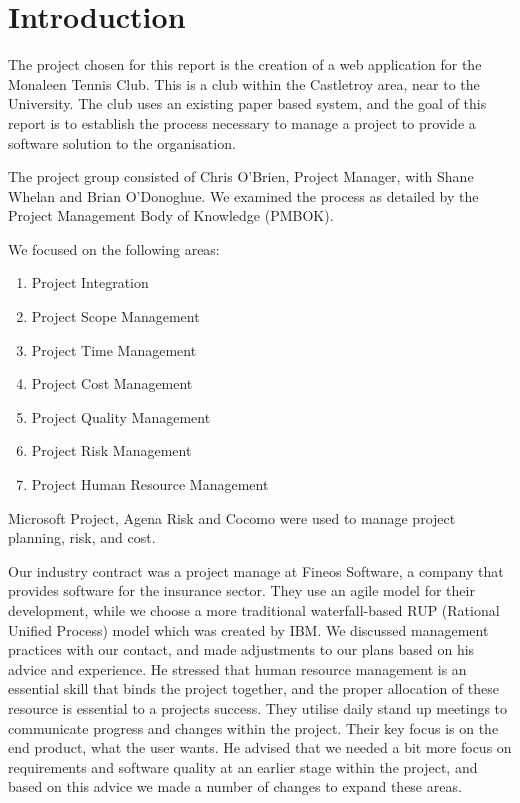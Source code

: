 \chapter{Introduction}

The project chosen for this report is the creation of a web application for the Monaleen Tennis Club. This is a club within the Castletroy area, near to the University. The club uses an existing paper based system, and the goal of this report is to establish the process necessary to manage a project to provide a software solution to the organisation. 

The project group consisted of Chris O'Brien, Project Manager, with Shane Whelan and Brian O'Donoghue. We examined the process as detailed by the Project Management Body of Knowledge (PMBOK).

We focused on the following areas:

\begin{enumerate}
\item Project Integration
\item Project Scope Management
\item Project Time Management
\item Project Cost Management
\item Project Quality Management
\item Project Risk Management
\item Project Human Resource Management
\end{enumerate}

Microsoft Project, Agena Risk and Cocomo were used to manage project planning, risk, and cost. 

Our industry contract was a project manage at Fineos Software, a company that provides software for the insurance sector. They use an agile model for their development, while we choose a more traditional waterfall-based RUP (Rational Unified Process) model which was created by IBM. We discussed management practices with our contact, and made adjustments to our plans based on his advice and experience. He stressed that human resource management is an essential skill that binds the project together, and the proper allocation of these resource is essential to a projects success. They utilise daily stand up meetings to communicate progress and changes within the project. Their key focus is on the end product, what the user wants. He advised that we needed a bit more focus on requirements and software quality at an earlier stage within the project, and based on this advice we made a number of changes to expand these areas.

